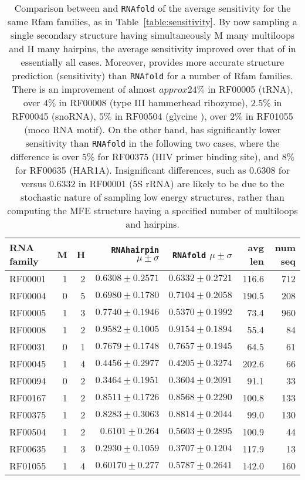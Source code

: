 \begin{table*}[!b]
\begin{tabular}{|l|rrrrrr|}
\hline
RNA family & M & H & {\tt RNAhairpin} $\mu \pm \sigma$ & {\tt RNAfold}
$\mu \pm \sigma$ & avg len & num seq\\
\hline
RF00001 & 1 & 2 & $0.6308 \pm 0.2571$ & $0.6332 \pm 0.2721$ & 116.6 & 712\\
RF00004 & 0 & 5 & $0.6980 \pm 0.1780$ & $0.7104 \pm 0.2058$ & 190.5 & 208 \\
RF00005 & 1 & 3 & $0.7740 \pm 0.1946$ & $0.5370 \pm 0.1992$ & 73.4 &960  \\
RF00008 & 1 & 2 & $0.9582 \pm 0.1005 $ & $0.9154 \pm 0.1894$ & 55.4 & 84\\
RF00031 & 0 & 1 & $0.7679 \pm 0.1748$ & $0.7657 \pm 0.1945$ & 64.5 & 61\\
RF00045 & 1 & 4 & $0.4456 \pm 0.2977$ & $0.4205 \pm 0.3274$ & 202.6 & 66 \\
RF00094 & 0 & 2 & $0.3464 \pm 0.1951$ & $0.3604 \pm 0.2091$ & 91.1 & 33\\
RF00167 & 1 & 2 & $0.8511 \pm 0.1726$ & $0.8568 \pm 0.2290$ & 100.8 & 133 \\
RF00375 & 1 & 2 & $0.8283 \pm 0.3063$ & $0.8814 \pm 0.2044$ & 99.0 & 130\\
RF00504 & 1 & 2 & $0.6101 \pm 0.264$ & $0.5603 \pm 0.2895$ & 100.9 & 44\\
RF00635 & 1 & 3 & $0.2930 \pm 0.1059$ & $0.3707 \pm 0.1204$ & 117.9 & 13\\
RF01055 & 1 & 4 & $0.60170 \pm 0.277$ & $0.5787 \pm 0.2641$ & 142.0 & 160 \\
\hline
\end{tabular}
\caption{Comparison between {\rnahairpinml} and {\tt RNAfold}
of the average sensitivity for the same Rfam families, as in
Table~\ref{table:sensitivity}. By now sampling a single secondary structure
having simultaneously M many multiloops and H many hairpins, the
average sensitivity improved over that of {\rnahairpin}
in essentially all cases.
Moreover, {\rnahairpinml} provides more accurate structure
prediction (sensitivity) than {\tt RNAfold} for a number of
Rfam families. There is an improvement
of almost $approx 24\%$ in RF00005 (tRNA),
over $4\%$ in RF00008 (type III hammerhead ribozyme),
$2.5\%$ in RF00045 (snoRNA),
$5\%$ in RF00504  (glycine \rb),
over $2\%$ in RF01055 (moco RNA motif).
On the other hand, {\rnahairpinml} has significantly lower
sensitivity than {\tt RNAfold} in the following two cases, where
the difference is over $5\%$ for RF00375 (HIV primer binding site),
and $8\%$ for RF00635 (HAR1A).
Insignificant differences, such as
$0.6308$ for {\rnahairpinml} versus $0.6332$ in RF00001 (5S rRNA)
are likely to be due to the stochastic nature of sampling low energy
structures, rather than computing the MFE structure having a specified
number of multiloops and hairpins.
}
\label{table:sensitivityMultiloopHairpin}
\end{table*}

